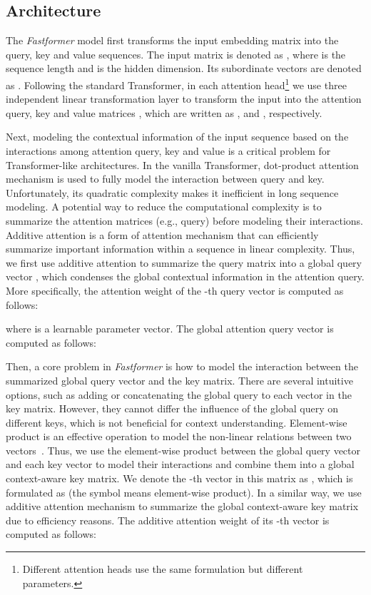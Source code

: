 \documentclass[11pt,a4paper]{article}
\begin{document}
\subsection{Architecture}

The \textit{Fastformer} model first transforms the input embedding matrix into the query, key and value sequences.
The input matrix is denoted as , where  is the sequence length and  is the hidden dimension.
Its subordinate vectors are denoted as .
Following the standard Transformer, in each attention head\footnote{Different attention heads use the same formulation but different parameters.} we use three independent linear transformation layer to transform the input into the attention query, key and value matrices , which are written as ,  and , respectively.

Next, modeling the contextual information of the input sequence based on the interactions among attention query, key and value is a critical problem for Transformer-like architectures.
In the vanilla Transformer, dot-product attention mechanism is used to fully model the interaction between query and key.
Unfortunately, its quadratic complexity makes it inefficient in long sequence modeling.
A potential way to reduce the computational complexity is to summarize the attention matrices (e.g., query) before modeling their interactions.
Additive attention is a form of attention mechanism that can efficiently summarize important information within a sequence in linear complexity.
Thus, we first use  additive attention to summarize the query matrix into a global query vector , which condenses the global contextual information in the attention query.
More specifically, the attention weight  of the -th query vector is computed as follows:

where  is a learnable parameter vector.
The global attention query vector is computed as follows:


Then, a core problem in \textit{Fastformer} is how to model the interaction between the summarized global query vector and the key matrix.
There are several intuitive options, such as adding or concatenating the global query to each vector in the key matrix.
However, they cannot differ the influence of the global query on different keys, which is not beneficial for context understanding.
Element-wise product is an effective operation to model the non-linear relations between two vectors~\cite{wang2017item}.
Thus, we use the element-wise product between the global query vector and each key vector to model their interactions and combine them into a global context-aware key matrix.
We denote the -th vector in this matrix as , which is formulated as  (the symbol  means element-wise product).
In a similar way, we use additive attention mechanism to summarize the global context-aware key matrix due to efficiency reasons.
The additive attention weight of its -th vector is computed as follows:
\end{document}
